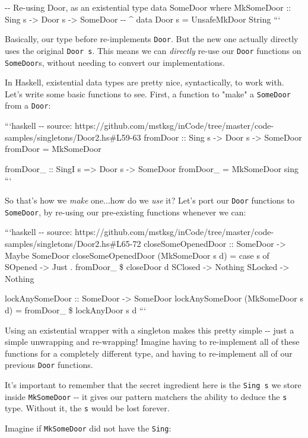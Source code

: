 \documentclass[]{article}
\begin{document}
-\/- \textbar{} Re-using Door, as an existential type data SomeDoor where
MkSomeDoor :: Sing s -\textgreater{} Door s -\textgreater{} SomeDoor -\/- \^{}
data Door s = UnsafeMkDoor String ```

Basically, our type before re-implements \texttt{Door}. But the new one actually
directly uses the original \texttt{Door\ s}. This means we can \emph{directly}
re-use our \texttt{Door} functions on \texttt{SomeDoor}s, without needing to
convert our implementations.

In Haskell, existential data types are pretty nice, syntactically, to work with.
Let's write some basic functions to see. First, a function to "make" a
\texttt{SomeDoor} from a \texttt{Door}:

```haskell -\/- source:
https://github.com/mstksg/inCode/tree/master/code-samples/singletons/Door2.hs\#L59-63
fromDoor :: Sing s -\textgreater{} Door s -\textgreater{} SomeDoor fromDoor =
MkSomeDoor

fromDoor\_ :: SingI s =\textgreater{} Door s -\textgreater{} SomeDoor fromDoor\_
= MkSomeDoor sing ```

So that's how we \emph{make} one...how do we \emph{use} it? Let's port our
\texttt{Door} functions to \texttt{SomeDoor}, by re-using our pre-existing
functions whenever we can:

```haskell -\/- source:
https://github.com/mstksg/inCode/tree/master/code-samples/singletons/Door2.hs\#L65-72
closeSomeOpenedDoor :: SomeDoor -\textgreater{} Maybe SomeDoor
closeSomeOpenedDoor (MkSomeDoor s d) = case s of SOpened -\textgreater{} Just .
fromDoor\_ \$ closeDoor d SClosed -\textgreater{} Nothing SLocked
-\textgreater{} Nothing

lockAnySomeDoor :: SomeDoor -\textgreater{} SomeDoor lockAnySomeDoor (MkSomeDoor
s d) = fromDoor\_ \$ lockAnyDoor s d ```

Using an existential wrapper with a singleton makes this pretty simple -\/- just
a simple unwrapping and re-wrapping! Imagine having to re-implement all of these
functions for a completely different type, and having to re-implement all of our
previous \texttt{Door} functions.

It's important to remember that the secret ingredient here is the
\texttt{Sing\ s} we store inside \texttt{MkSomeDoor} -\/- it gives our pattern
matchers the ability to deduce the \texttt{s} type. Without it, the \texttt{s}
would be lost forever.

Imagine if \texttt{MkSomeDoor} did not have the \texttt{Sing}:
\end{document}
